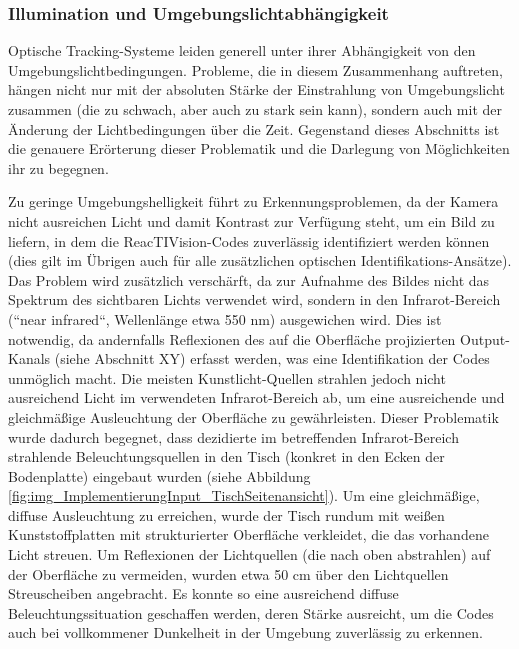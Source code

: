 \subsubsection{Illumination und Umgebungslichtabhängigkeit} %
\label{sub:illumination_und_umgebungslichtabhängigkeit}

Optische Tracking-Systeme leiden generell unter ihrer Abhängigkeit von den Umgebungslichtbedingungen. Probleme, die in diesem Zusammenhang auftreten, hängen nicht nur mit der absoluten Stärke der Einstrahlung von Umgebungslicht zusammen (die zu schwach, aber auch zu stark sein kann), sondern auch mit der Änderung der Lichtbedingungen über die Zeit. Gegenstand dieses Abschnitts ist die genauere Erörterung dieser Problematik und die Darlegung von Möglichkeiten ihr zu begegnen.

Zu geringe Umgebungshelligkeit führt zu Erkennungsproblemen, da der Kamera nicht ausreichen Licht und damit Kontrast zur Verfügung steht, um ein Bild zu liefern, in dem die ReacTIVision-Codes zuverlässig identifiziert werden können (dies gilt im Übrigen auch für alle zusätzlichen optischen Identifikations-Ansätze). Das Problem wird zusätzlich verschärft, da zur Aufnahme des Bildes nicht das Spektrum des sichtbaren Lichts verwendet wird, sondern in den Infrarot-Bereich (“near infrared“, Wellenlänge etwa 550 nm) ausgewichen wird. Dies ist notwendig, da andernfalls Reflexionen des auf die Oberfläche projizierten Output-Kanals (siehe Abschnitt XY) erfasst werden, was eine Identifikation der Codes unmöglich macht. Die meisten Kunstlicht-Quellen strahlen jedoch nicht ausreichend Licht im verwendeten Infrarot-Bereich ab, um eine ausreichende und gleichmäßige Ausleuchtung der Oberfläche zu gewährleisten. Dieser Problematik wurde dadurch begegnet, dass dezidierte im betreffenden Infrarot-Bereich strahlende Beleuchtungsquellen in den Tisch (konkret in den Ecken der Bodenplatte) eingebaut wurden (siehe Abbildung \ref{fig:img_ImplementierungInput_TischSeitenansicht}). Um eine gleichmäßige, diffuse Ausleuchtung zu erreichen, wurde der Tisch rundum mit weißen Kunststoffplatten mit strukturierter Oberfläche verkleidet, die das vorhandene Licht streuen. Um Reflexionen der Lichtquellen (die nach oben abstrahlen) auf der Oberfläche zu vermeiden, wurden etwa 50 cm über den Lichtquellen Streuscheiben angebracht. Es konnte so eine ausreichend diffuse Beleuchtungssituation geschaffen werden, deren Stärke ausreicht, um die Codes auch bei vollkommener Dunkelheit in der Umgebung zuverlässig zu erkennen.

